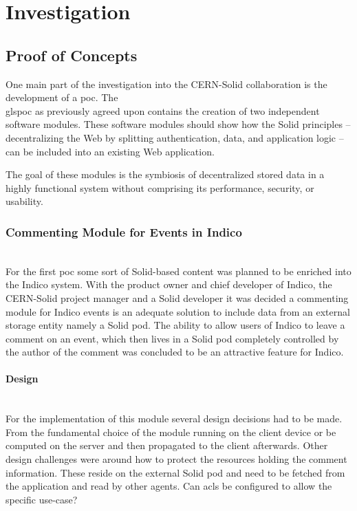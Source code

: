 \chapter{Investigation}

\section{Proof of Concepts}

One main part of the investigation into the CERN-Solid collaboration is the development of a \gls{poc}. The \\gls{poc} as previously agreed upon contains the creation of two independent software modules. These software modules should show how the Solid principles -- decentralizing the Web by splitting authentication, data, and application logic -- can be included into an existing Web application.

The goal of these modules is the symbiosis of decentralized stored data in a highly functional system without comprising its performance, security, or usability.

\subsection{Commenting Module for Events in Indico}\mbox{}\\

For the first \gls{poc} some sort of Solid-based content was planned to be enriched into the Indico system. With the product owner and chief developer of Indico, the CERN-Solid project manager and a Solid developer it was decided a commenting module for Indico events is an adequate solution to include data from an external storage entity namely a Solid pod. The ability to allow users of Indico to leave a comment on an event, which then lives in a Solid pod completely controlled by the author of the comment was concluded to be an attractive feature for Indico.

\subsubsection{Design}\mbox{}\\

For the implementation of this module several design decisions had to be made. From the fundamental choice of the module running on the client device or be computed on the server and then propagated to the client afterwards.
Other design challenges were around how to protect the resources holding the comment information. These reside on the external Solid pod and need to be fetched from the application and read by other agents. Can \glspl{acl} be configured to allow the specific use-case?

